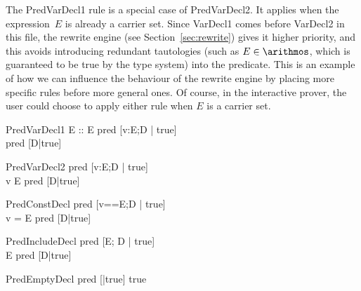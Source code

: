 The PredVarDecl1 rule is a special case of PredVarDecl2.  It applies
when the expression~$E$ is already a carrier set.  Since VarDecl1
comes before VarDecl2 in this file, the rewrite engine (see
Section~\ref{sec:rewrite}) gives it higher priority, and this avoids
introducing redundant tautologies (such as $E \in \arithmos$, which is
guaranteed to be true by the type system) into the predicate.  This is
an example of how we can influence the behaviour of the rewrite engine
by placing more specific rules before more general ones.  Of course,
in the interactive prover, the user could choose to apply either rule
when $E$ is a carrier set.


\begin{zedrule}{PredVarDecl1}
  E :: \power E
\derives
  pred [v:E;D | true] \iff \\ pred [D|true]
\end{zedrule}

\begin{zedrule}{PredVarDecl2}
  pred [v:E;D | true] \iff \\ v \in E \land pred [D|true]
\end{zedrule}

\begin{zedrule}{PredConstDecl}
  pred [v==E;D | true] \iff \\ v = E \land pred [D|true]
\end{zedrule}

\begin{zedrule}{PredIncludeDecl}
   pred [E; D | true] \iff \\ E \land pred [D|true]
\end{zedrule}

\begin{zedrule}{PredEmptyDecl}
  pred [|true] \iff true
\end{zedrule}
